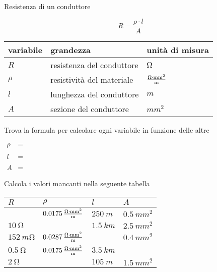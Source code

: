 \begin{questions}
\begin{parts}
	\end{parts}
	
	
	
	\exnewpage
	\question Resistenza di un conduttore 
	
	\begin{equation*}
	R=\dfrac{\rho \cdot l}{A}
	\end{equation*}
	
	\begin{center}
		\renewcommand\arraystretch{1.2}	
		\begin{tabular}{lll}
			\hline
			variabile & grandezza & unità di misura \\
			\hline
			$R$ & resistenza del conduttore & $\si{\ohm}$ \\
			$\rho$ & resistività del materiale & $\si{\frac{\ohm \cdot mm^2}{m}}$\\
			$l$ & lunghezza del conduttore & $\si{m}$ \\
			$A$ & sezione del conduttore & $\si{mm^2}$ \\
			\hline
		\end{tabular}
	\end{center}
	
	
	\begin{parts}	
		\item Trova la formula per calcolare ogni variabile in funzione delle altre
		
		
		
		$
		\begin{aligned}
		\rho & =\\
		&\\
		l & =\\
		&\\
		A & =
		\end{aligned}
		$
		
		
		
		\item Calcola i valori mancanti nella seguente tabella
		
		\bigskip
		
		
		\renewcommand\arraystretch{2.2}
		\begin{tabular}{|C{3cm}|C{3cm}|C{3cm}|C{3cm}|}
			\hline
			$R$ & $\rho$ & $l$ & $A$ \\
			\hline
			& $\SI{0.0175}{\frac{\ohm \cdot mm^2}{m}}$ & $\SI{250}{m}$ & $\SI{0.5}{mm^2}$ \\
			$\SI{10}{\ohm}$ &  & $\SI{1.5}{km}$ & $\SI{2.5}{mm^2}$ \\
			$\SI{152}{m\ohm}$ &  $\SI{0.0287}{\frac{\ohm \cdot mm^2}{m}}$ &  & $\SI{0.4}{mm^2}$ \\
			$\SI{0.5}{\ohm}$ & $\SI{0.0175}{\frac{\ohm \cdot mm^2}{m}}$ & $\SI{3.5}{km}$ \\
			$\SI{2}{\ohm}$ &  & $\SI{105}{m}$ & $\SI{1.5}{mm^2}$ \\
			\hline
		\end{tabular}
		
		
		
	\end{parts}
	
\end{questions}

